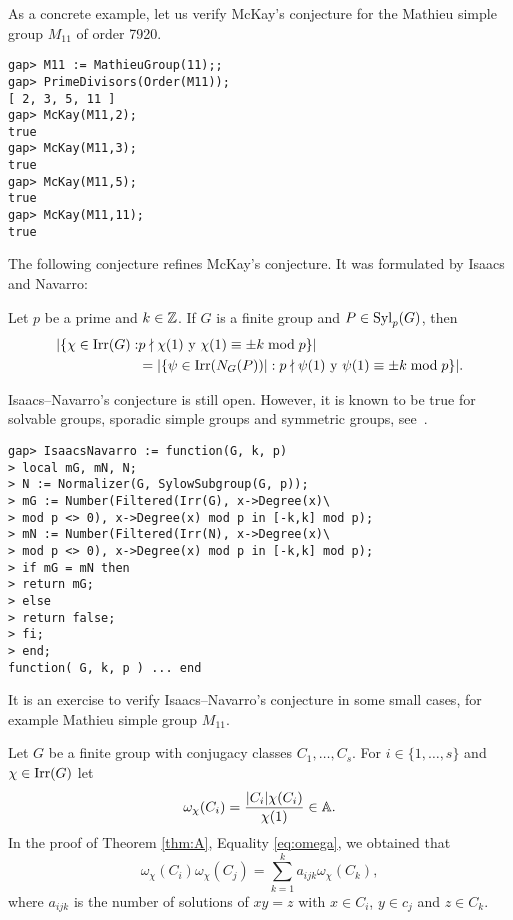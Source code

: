 As a concrete example, let us 
verify McKay's conjecture for the Mathieu simple group 
$M_{11}$ of order 7920. 

\begin{lstlisting}
gap> M11 := MathieuGroup(11);;
gap> PrimeDivisors(Order(M11));
[ 2, 3, 5, 11 ]
gap> McKay(M11,2);
true
gap> McKay(M11,3);
true
gap> McKay(M11,5);
true
gap> McKay(M11,11);
true
\end{lstlisting}

The following conjecture refines McKay's conjecture. It was
formulated by Isaacs and Navarro:

\begin{conjecture}
Let $p$ be a prime and $k\in\mathbb{Z}$. 
If $G$ is a finite group and $P\in\mathrm{Syl}_p(G)$,
then
\begin{align*}
|\{\chi\in\operatorname{Irr}(G):&p\nmid \chi(1)\text{ y }\chi(1)\equiv\pm k\bmod p\}|\\
&=|\{\psi\in\operatorname{Irr}(N_G(P))|:p\nmid\psi(1)\text{ y }\psi(1)\equiv\pm k\bmod p\}|.
\end{align*}
\end{conjecture}

Isaacs--Navarro's conjecture is still open. However, 
it is known to be true for solvable groups, 
sporadic simple groups and 
symmetric groups, see~\cite{MR1935849}. 

\begin{lstlisting}
gap> IsaacsNavarro := function(G, k, p)
> local mG, mN, N;
> N := Normalizer(G, SylowSubgroup(G, p));
> mG := Number(Filtered(Irr(G), x->Degree(x)\
> mod p <> 0), x->Degree(x) mod p in [-k,k] mod p);
> mN := Number(Filtered(Irr(N), x->Degree(x)\
> mod p <> 0), x->Degree(x) mod p in [-k,k] mod p);
> if mG = mN then
> return mG;
> else
> return false;
> fi;
> end;
function( G, k, p ) ... end
\end{lstlisting}

It is an exercise to verify Isaacs--Navarro's conjecture in some
small cases, for example Mathieu simple group $M_{11}$. 

\label{commutators}

Let $G$ be a finite group with conjugacy classes $C_1,\dots,C_s$. For
$i\in\{1,\dots,s\}$ and $\chi\in\operatorname{Irr}(G)$ let  
\[
\omega_{\chi}(C_i)=\frac{|C_i|\chi(C_i)}{\chi(1)}\in\mathbb{A}.
\]
In the proof of Theorem \ref{thm:A}, Equality \eqref{eq:omega}, 
we obtained
that 
\begin{equation}
\label{eq:again_omega}
\omega_\chi(C_i)\omega_\chi(C_j)=\sum_{k=1}^ka_{ijk}\omega_{\chi}(C_k),
\end{equation}
where $a_{ijk}$ is the number of solutions 
of $xy=z$ with $x\in C_i$, $y\in c_j$ and $z\in C_k$. 

